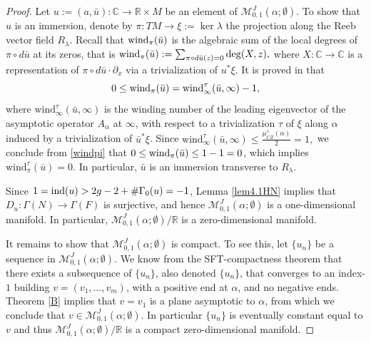 \documentclass{amsart}
\newcommand{\C}{\mathbb{C}}
\newcommand{\R}{\mathbb{R}}
\newcommand{\M}{\mathcal{M}}
\newcommand{\CZ}{\mu_{CZ}^{\tau}}
\newcommand{\wind}{\text{wind}^{\tau}}
\newcommand{\windd}{\text{wind}}
\newcommand{\ind}{\textnormal{ind}}
\begin{document}
\begin{proof}
Let $u:=(a,\bar u):\C \to \R \times M$ be an element of $\M_{0,1}^J(\alpha; \emptyset)$. To show that $u$ is an immersion, denote by $\pi:TM \to \xi:=\ker \lambda$ the projection along the Reeb vector field $R_{\lambda}$. Recall that ${\rm wind}_\pi(\bar u)$ is the algebraic sum of the local degrees of $\pi \circ d\bar u$ at its zeros, that is
$
\windd_{\pi}(\bar{u}):=\sum_{\pi \circ d\bar{u}(z)=0}{\rm deg}(X,z),
$
where $X:\C \to \C$ is a representation of $\pi \circ d\bar{u} \cdot \partial_x$ via a trivialization of $u^*\xi$.
It is proved in \cite{prop2} that 
\begin{equation}\label{windpi}
0\leq {\rm wind}_{\pi}(\bar{u})=\wind_{\infty}(\bar{u},\infty)-1,
\end{equation}
where $\wind_\infty(\bar u,\infty)$ is the winding number of the leading eigenvector of the asymptotic operator $A_{\alpha}$ at $\infty$, with respect to a trivialization $\tau$ of $\xi$ along $\alpha$ induced by a trivialization of $\bar u^*\xi$.
Since  $\wind_{\infty}(\bar{u},\infty) \leq \frac{\CZ(\alpha)}{2}=1,$
we conclude from \eqref{windpi} that
$0 \leq {\rm wind}_{\pi}(\bar u)\leq 1-1=0$, which implies 
$
\wind_{\pi}(\bar{u})=0.
$
In particular, $\bar u$ is an immersion transverse to $R_\lambda$.

Since  $1=\ind(u) > 2g -2 + \#\Gamma_0(u) = -1$, Lemma \ref{lem4.1HN} implies that  $D_u:\Gamma(N) \to \Gamma(F)$ is surjective, and hence $\M_{0,1}^J({\alpha}; \emptyset)$ is a one-dimensional manifold. In particular, $\M_{0,1}^J({\alpha}; \emptyset)/\R$ is a zero-dimensional manifold.

It remains to show that $\M_{0,1}^J({\alpha}; \emptyset)$ is compact.
To see this, let $\{u_n\}$ be a sequence in $\M^J_{0,1}(\alpha; \emptyset)$. We know from the SFT-compactness theorem that there exists a subsequence of $\{u_n\}$, also denoted  $\{u_n\}$, that converges to an index-$1$ building $v=(v_1,\ldots,v_m)$, with a positive end at $\alpha$, and no negative ends. Theorem \ref{B} implies that  $v=v_1$ is a plane asymptotic to $\alpha$, from which we conclude that $v \in \M_{0,1}^J(\alpha;\emptyset)$. In particular $\{u_n\}$ is eventually constant equal to $v$ and thus $\M_{0,1}^J(\alpha;\emptyset)/\R$ is a compact zero-dimensional manifold.
\end{proof}
\end{document}
